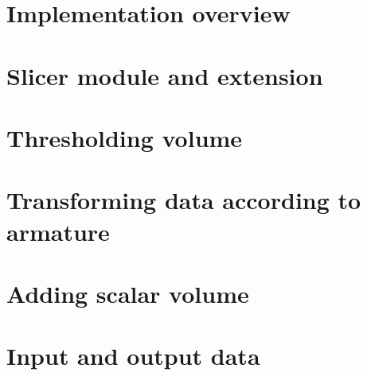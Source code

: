 \section{Implementation overview}

\section{Slicer module and extension}

\section{Thresholding volume}

\section{Transforming data according to armature}

\section{Adding scalar volume}

\section{Input and output data}
